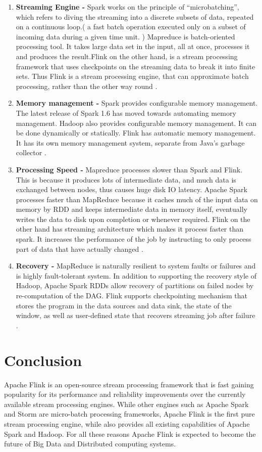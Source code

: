 \begin{enumerate}
    \item \textbf{Streaming Engine - }
    Spark works on the principle of ``microbatching'', which refers to diving the streaming into a discrete subsets of data, repeated on a continuous loop.( a fast batch operation executed only on a subset of incoming data during a given time unit. ) Mapreduce is batch-oriented processing tool. It takes large data set in the input, all at once, processes it and produces the result.Flink on the other hand, is a stream processing framework that uses checkpoints on the streaming data to break it into finite sets. Thus Flink is a stream processing engine, that can approximate batch processing, rather than the other way round \cite{link5}.
    \item \textbf{Memory management - }
    Spark provides configurable memory management. The latest release of Spark 1.6 has moved towards automating memory management. Hadoop also provides configurable memory management. It can be done dynamically or statically. Flink has automatic memory management. It has its own memory management system, separate from Java's garbage collector \cite{link5}.
    \item \textbf{Processing Speed - }
    Mapreduce processes slower than Spark and Flink. This is because it produces lots of intermediate data, and much data is exchanged between nodes, thus causes huge disk IO latency. Apache Spark processes faster than MapReduce because it caches much of the input data on memory by RDD and keeps intermediate data in memory itself, eventually writes the data to disk upon completion or whenever required. Flink on the other hand has streaming architecture which makes it process faster than spark. It increases the performance of the job by instructing to only process part of data that have actually changed \cite{link5}.
    \item \textbf{Recovery - }
    MapReduce is naturally resilient to system faults or failures and is highly fault-tolerant system. In addition to supporting the recovery style of Hadoop, Apache Spark RDDs allow recovery of partitions on failed nodes by re-computation of the DAG. Flink supports checkpointing mechanism that stores the program in the data sources and data sink, the state of the window, as well as user-defined state that recovers streaming job after failure \cite{link5}.
\end{enumerate}

\section{Conclusion}
Apache Flink is an  open-source stream processing framework that is fast gaining popularity for its performance and reliability improvements over the currently available stream processing engines. While other engines such as Apache Spark and Storm are micro-batch processing frameworks, Apache Flink is the first pure stream processing engine, while also provides all existing capabilities of Apache Spark and Hadoop. For all these reasons Apache Flink is expected to become the future of Big Data and Distributed computing systems.

